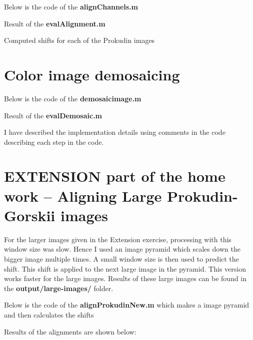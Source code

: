 \documentclass[10pt,letterpaper]{article}
\begin{document}
\newpage
Below is the code of the \textbf{alignChannels.m}\newline


\newpage
Result of the \textbf{evalAlignment.m}\newline


Computed shifts for each of the Prokudin images\newline


\newpage
\section{Color image demosaicing}
Below is the code of the \textbf{demosaicimage.m}\newline


Result of the \textbf{evalDemosaic.m}\newline


I have described the implementation details using comments in the code describing each step in the code.\newpage



\section{EXTENSION part of the home work -- Aligning Large Prokudin-Gorskii images}
For the larger images given in the Extension exercise, processing with this window size was slow. Hence I used an image pyramid which scales down the bigger image multiple times. A small window size is then used to predict the shift. This shift is applied to the next large image in the pyramid. This version works faster for the large images. Results of these large images can be found in the \textbf{output/large-images/} folder.\newline\newline

Below is the code of the \textbf{alignProkudinNew.m} which makes a image pyramid and then calculates the shifts\newline



Results of the alignments are shown below:

\newpage
 
\end{document}
